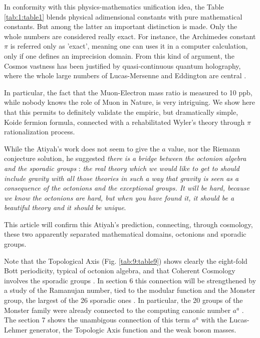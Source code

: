 \documentclass[a4paper,9pt]{article}
\begin{document}
   
   In conformity with this physics-mathematics unification idea, the Table \ref{tab:1:table1} blends physical adimensional constants \cite{Tanabashi} with pure mathematical constants. But among the latter an important distinction is made. Only the whole numbers are considered really exact. For instance, the Archimedes constant $\pi$ is referred only as 'exact', meaning one can uses it in a computer calculation, only if one defines an imprecision domain. From this kind of argument, the Cosmos vastness has been justified by quasi-continuous quantum holography, where the whole large numbers of Lucas-Mersenne \cite{Bastin} and Eddington \cite{Eddington} are central \cite{Sanchez}.
      
      
   In particular, the fact that the Muon-Electron mass ratio is measured to 10 ppb, while nobody knows the role of Muon in Nature, is very intriguing. We show here that this permits to definitely validate the empiric, but dramatically simple, Koide fermion formula, connected with a rehabilitated Wyler's theory through $\pi$ rationalization process. 
   
   
   While the Atiyah's work does not seem to give the $a$ value, nor the Riemann conjecture solution, he suggested \cite{Atiyah1} \textit{there is a bridge between the octonion algebra and the sporadic groups} : \textit {the real theory which we would like to get to should include gravity with all those theories in such a way that gravity is seen as a consequence of the octonions and the exceptional groups. It will be hard, because we know the octonions are hard, but when you have found it, it should be a beautiful theory and it should be unique}. 
   
   
   
   This article will confirm this Atiyah's prediction, connecting, through cosmology, these two apparently separated mathematical domains, octonions and sporadic groups.
   
   
   
   Note that the Topological Axis (Fig. \ref{tab:9:table9}) shows clearly the eight-fold Bott periodicity, typical of octonion algebra, and that Coherent Cosmology involves the sporadic groups \cite{Sanchez}. In section 6 this connection will be strengthened by a study of the Ramanujan number, tied to the modular function and the Monster group, the largest of the 26 sporadic ones \cite{Conway} \cite{Borcherds}. In particular, the 20 groups of the Monster family were already connected to the computing canonic number $a^a$ \cite{Sanchez}. The section 7 shows the unambigous connection of this term $a^a$ with the Lucas-Lehmer generator, the Topologic Axis function and the weak boson masses.  
   
\end{document}

